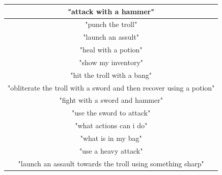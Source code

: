 \documentclass[11pt]{article}
\begin{document}
\begin{table}[H]
\centering
\begin{tabular}{|c|}
\hline
"attack with a hammer"                    \\ \hline
"punch the troll"   \\ \hline
"launch an assult"           \\ \hline
"heal with a potion"  \\ \hline
"show my inventory"      \\ \hline
"hit the troll with a bang"        \\ \hline
"obliterate the troll with a sword and then recover using a potion" \\ \hline
"fight with a sword and hammer"                      \\ \hline
"use the sword to attack"            \\ \hline
"what actions can i do"                \\ \hline
"what is in my bag"                    \\ \hline
"use a heavy attack"              \\ \hline
"launch an assault towards the troll using something sharp"             \\ \hline
\end{tabular}
\end{table}

\newpage
\end{document}
